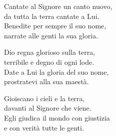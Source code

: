 

\spazio

\strofa Cantate al Signore un canto nuovo,\\
da tutta la terra cantate a Lui.\\
Benedite per sempre il suo nome,\\
narrate alle genti la sua gloria.

\spazio


\spazio

\strofa Dio regna glorioso sulla terra,\\
terribile e degno di ogni lode.\\
Date a Lui la gloria del suo nome,\\
prostratevi alla sua maestà.

\spazio


\spazio

\strofa Gioiscano i cieli e la terra,\\
davanti al Signore che viene.\\
Egli giudica il mondo con giustizia\\
e con verità tutte le genti.

\spazio

